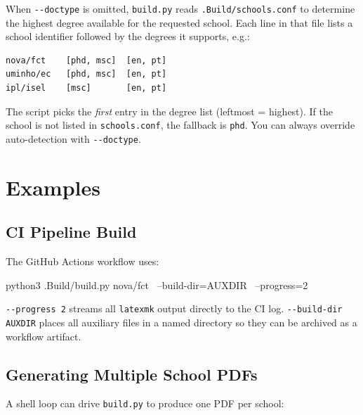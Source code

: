 When \verb!--doctype! is omitted, \texttt{build.py} reads
\verb!.Build/schools.conf! to determine the highest degree available for the
requested school.  Each line in that file lists a school identifier followed
by the degrees it supports, e.g.:

\begin{verbatim}
nova/fct    [phd, msc]  [en, pt]
uminho/ec   [phd, msc]  [en, pt]
ipl/isel    [msc]       [en, pt]
\end{verbatim}

The script picks the \emph{first} entry in the degree list (leftmost = highest).
If the school is not listed in \verb!schools.conf!, the fallback is
\texttt{phd}.  You can always override auto-detection with \verb!--doctype!.


\section{Examples}
\label{sec:buildpy_examples}

\subsection{CI Pipeline Build}
\label{sec:buildpy_ci}

The GitHub Actions workflow uses:

\begin{bashcode}
python3 .Build/build.py nova/fct \
    --build-dir=AUXDIR \
    --progress=2
\end{bashcode}

\verb!--progress 2! streams all \texttt{latexmk} output directly to the
CI log.  \verb!--build-dir AUXDIR! places all auxiliary files in a named
directory so they can be archived as a workflow artifact.

\subsection{Generating Multiple School PDFs}
\label{sec:buildpy_multi}

A shell loop can drive \texttt{build.py} to produce one PDF per school:

